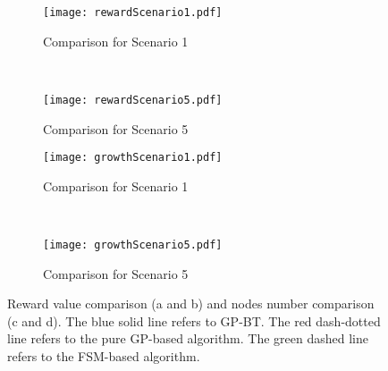 \begin{figure}[t]
        \centering
        \begin{subfigure}[b]{0.5\columnwidth}
                \centering
                \texttt{[image: rewardScenario1.pdf]}
                \caption{ Comparison for Scenario 1}
                \label{ER.fig.rs1}
        \end{subfigure}%
       ~ %
        \begin{subfigure}[b]{0.5\columnwidth}
                \centering
                \texttt{[image: rewardScenario5.pdf]}
                \caption{ Comparison for Scenario 5}
                \label{ER.fig.rs5}              
        \end{subfigure}
        \begin{subfigure}[b]{0.5\columnwidth}
                \centering
                \texttt{[image: growthScenario1.pdf]}
                \caption{ Comparison for Scenario 1}
                \label{ER.fig.nns1}
        \end{subfigure}%
       ~ %
        \begin{subfigure}[b]{0.5\columnwidth}
                \centering
                \texttt{[image: growthScenario5.pdf]}
                \caption{ Comparison for Scenario 5}
                \label{ER.fig.nns5}              
        \end{subfigure}
        \caption{ Reward value comparison (a and b) and nodes number comparison (c and d). The blue solid line refers to GP-BT. The red dash-dotted line refers to the pure GP-based algorithm. The green dashed line refers to the FSM-based algorithm.}
                \label{ER.fig.nodes}
\end{figure}


